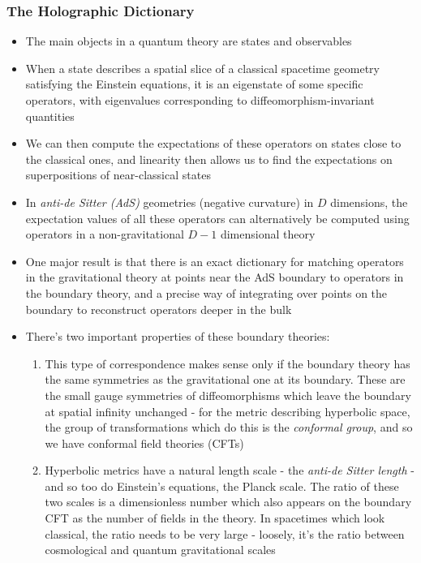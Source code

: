 \documentclass[12pt,a4paper]{article}
\numberwithin{equation}{section}
\begin{document}
	\subsubsection{The Holographic Dictionary}
	\begin{itemize}
		\item The main objects in a quantum theory are states and observables
		\item When a state describes a spatial slice of a classical spacetime geometry satisfying the Einstein equations, it is an eigenstate of some specific operators, with eigenvalues corresponding to diffeomorphism-invariant quantities
		\item We can then compute the expectations of these operators on states close to the classical ones, and linearity then allows us to find the expectations on superpositions of near-classical states
		\item In \textit{anti-de Sitter (AdS)} geometries (negative curvature) in $D$ dimensions, the expectation values of all these operators can alternatively be computed using operators in a non-gravitational $D-1$ dimensional theory
		\item One major result is that there is an exact dictionary for matching operators in the gravitational theory at points near the AdS boundary to operators in the boundary theory, and a precise way of integrating over points on the boundary to reconstruct operators deeper in the bulk
		\item There's two important properties of these boundary theories:
		\begin{enumerate}
			\item This type of correspondence makes sense only if the boundary theory has the same symmetries as the gravitational one at its boundary. These are the small gauge symmetries of diffeomorphisms which leave the boundary at spatial infinity unchanged - for the metric describing hyperbolic space, the group of transformations which do this is the \textit{conformal group}, and so we have conformal field theories (CFTs)
			\item Hyperbolic metrics have a natural length scale - the \textit{anti-de Sitter length} - and so too do Einstein's equations, the Planck scale. The ratio of these two scales is a dimensionless number which also appears on the boundary CFT as the number of fields in the theory. In spacetimes which look classical, the ratio needs to be very large - loosely, it's the ratio between cosmological and quantum gravitational scales
		\end{enumerate}

\end{itemize}
\end{document}
